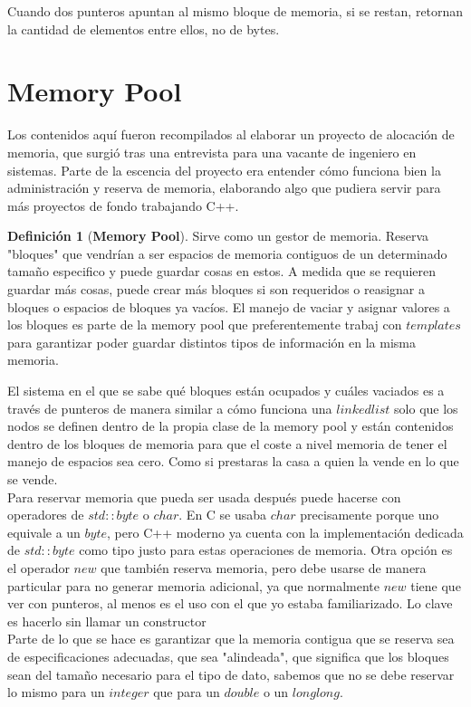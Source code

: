 \documentclass[11pt,a4paper,oneside]{report}
\theoremstyle{definition}
\newtheorem{definicion}{Definición}[chapter]
\theoremstyle{plain}
\theoremstyle{remark}
\newcommand{\termino}[1]{\textbf{#1}\index{#1}}
\begin{document}
Cuando dos punteros apuntan al mismo bloque de memoria, si se restan, retornan la cantidad de elementos entre ellos,
no de bytes.

\section{Memory Pool}

Los contenidos aquí fueron recompilados al elaborar un proyecto de alocación de memoria, que surgió 
tras una entrevista para una vacante de ingeniero en sistemas. 
Parte de la escencia del proyecto era entender cómo funciona bien la administración y reserva de memoria, elaborando algo
que pudiera servir para más proyectos de fondo trabajando C++. 

\begin{definicion}[\termino{Memory Pool}]
  Sirve como un gestor de memoria. Reserva "bloques" que vendrían a ser espacios de memoria contiguos de un determinado tamaño
  especifico y puede guardar cosas en estos. A medida que se requieren guardar más cosas, puede crear más bloques si son requeridos
  o reasignar a bloques o espacios de bloques ya vacíos. El manejo de vaciar y asignar valores a los bloques es parte de la memory 
  pool que preferentemente trabaj con $templates$ para garantizar poder guardar distintos tipos de información en la misma memoria. 
\end{definicion}
El sistema en el que se sabe qué bloques están ocupados y cuáles vaciados es a través de punteros de manera similar a cómo funciona 
una $linked list$ solo que los nodos se definen dentro de la propia clase de la memory pool y están contenidos dentro de los bloques 
de memoria para que el coste a nivel memoria de tener el manejo de espacios sea cero. Como si prestaras la casa a quien la vende en 
lo que se vende.\\
Para reservar memoria que pueda ser usada después puede hacerse con operadores de $std::byte$ o $char$. En C se usaba $char$ precisamente
porque uno equivale a un $byte$, pero C++ moderno ya cuenta con la implementación dedicada de $std::byte$ como tipo justo para estas operaciones
de memoria. Otra opción es el operador $new$ que también reserva memoria, pero debe usarse de manera particular para no generar memoria adicional,
ya que normalmente $new$ tiene que ver con punteros, al menos es el uso con el que yo estaba familiarizado. Lo clave es hacerlo sin llamar
un constructor\\
Parte de lo que se hace es garantizar que la memoria contigua que se reserva sea de especificaciones adecuadas, que sea 
"alindeada", que significa que los bloques sean del tamaño necesario para el tipo de dato, sabemos que no se debe reservar lo mismo para
un $integer$ que para un $double$ o un $long long$. 
\end{document}
